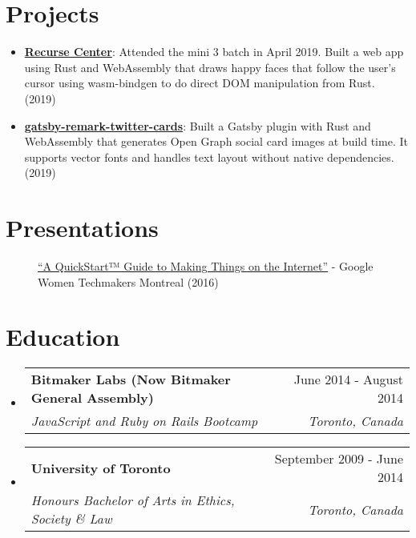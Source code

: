\documentclass[letterpaper,10.8pt]{article}
\makeatletter
\newcommand{\resumeItem}[2]{
  \item\small{
    \textbf{#1}{: #2 \vspace{-2pt}}
  }
}
\newcommand{\education}[4]{
  \vspace{0pt}\item[]
    \begin{tabular*}{1\textwidth}{l@{\extracolsep{\fill}}r}
      \textbf{#1} & #2 \\
      \textit{\small#3} & \textit{\small #4} \\
    \end{tabular*}\vspace{-4pt}
}
\newcommand{\resumeSubItem}[2]{\resumeItem{#1}{#2}\vspace{-5pt}}
\newcommand{\resumeSubHeadingListStart}{\begin{itemize}[leftmargin=*]}
\newcommand{\educationStart}{\begin{itemize}[leftmargin=0pt]}
\newcommand{\resumeSubHeadingListEnd}{\end{itemize}}
\makeatother
\begin{document}
\section{Projects}
\resumeSubHeadingListStart
\resumeSubItem{\href{https://github.com/alessbell/lines}{Recurse Center}}{Attended the mini 3 batch in April 2019. Built a web app using Rust and WebAssembly that draws happy faces that follow the user's cursor using wasm-bindgen to do direct DOM manipulation from Rust. (2019)}
\resumeSubItem{\href{https://aless.co/gatsby-wasm-plugin/}{gatsby-remark-twitter-cards}}{Built a Gatsby plugin with Rust and WebAssembly that generates Open Graph social card images at build time. It supports vector fonts and handles text layout without native dependencies. (2019)}
\vspace{5px}
\resumeSubHeadingListEnd


\section{Presentations}
\begin{description}
\item[] {\href{https://www.youtube.com/watch?v=6EHbfAmA_0c}{“A QuickStart™ Guide to Making Things on the Internet”} - Google Women Techmakers Montreal (2016)}
\end{description}

\section{Education}
  \educationStart
    \education
      {Bitmaker Labs (Now Bitmaker General Assembly)}{June 2014 - August 2014}
      {JavaScript and Ruby on Rails Bootcamp}{Toronto, Canada}
    \education
      {University of Toronto}{September 2009 - June 2014}
      {Honours Bachelor of Arts in Ethics, Society \& Law}{Toronto, Canada}
    \vspace{-4px}
  \resumeSubHeadingListEnd



\end{document}
